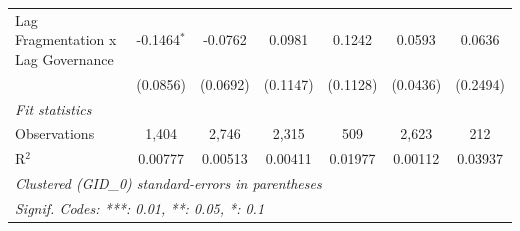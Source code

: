 \begin{table}[H]
\begin{tabular}{lcccccc}
      Lag Fragmentation x Lag Governance & -0.1464$^{*}$ & -0.0762       & 0.0981       & 0.1242        & 0.0593   & 0.0636\\   
                                         & (0.0856)      & (0.0692)      & (0.1147)     & (0.1128)      & (0.0436) & (0.2494)\\   
      \midrule
      \emph{Fit statistics}\\
      Observations                       & 1,404         & 2,746         & 2,315        & 509           & 2,623    & 212\\  
      R$^2$                              & 0.00777       & 0.00513       & 0.00411      & 0.01977       & 0.00112  & 0.03937\\  
      \midrule \midrule
      \multicolumn{7}{l}{\emph{Clustered (GID\_0) standard-errors in parentheses}}\\
      \multicolumn{7}{l}{\emph{Signif. Codes: ***: 0.01, **: 0.05, *: 0.1}}\\
   \end{tabular}
\end{table}




